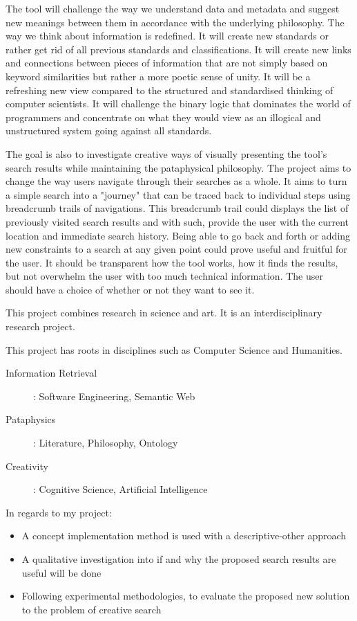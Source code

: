 The tool will challenge the way we understand data and metadata and suggest new meanings between them in accordance with the underlying philosophy. The way we think about information is redefined. It will create new standards or rather get rid of all previous standards and classifications. It will create new links and connections between pieces of information that are not simply based on keyword similarities but rather a more poetic sense of unity. It will be a refreshing new view compared to the structured and standardised thinking of computer scientists. It will challenge the binary logic that dominates the world of programmers and concentrate on what they would view as an illogical and unstructured system going against all standards.

The goal is also to investigate creative ways of visually presenting the tool's search results while maintaining the pataphysical philosophy. The project aims to change the way users navigate through their searches as a whole. It aims to turn a simple search into a "journey" that can be traced back to individual steps using breadcrumb trails of navigations. This breadcrumb trail could displays the list of previously visited search results and with such, provide the user with the current location and immediate search history. Being able to go back and forth or adding new constraints to a search at any given point could prove useful and fruitful for the user. It should be transparent how the tool works, how it finds the results, but not overwhelm the user with too much technical information. The user should have a choice of whether or not they want to see it.

This project combines research in science and art. It is an interdisciplinary research project.

This project has roots in disciplines such as Computer Science and Humanities.
\begin{description}
  \item [Information Retrieval]: Software Engineering, Semantic Web
  \item [Pataphysics]: Literature, Philosophy, Ontology
  \item [Creativity]: Cognitive Science, Artificial Intelligence
\end{description}

In regards to my project:
\begin{itemize}
  \item A concept implementation method is used with a descriptive-other approach
  \item A qualitative investigation into if and why the proposed search results are useful will be done
  \item Following experimental methodologies, to evaluate the proposed new solution to the problem of creative search
\end{itemize}

